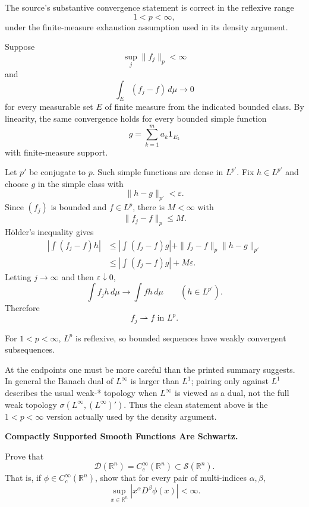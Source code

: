 \begin{solution}
The source's substantive convergence statement is correct in the reflexive range
\[
1<p<\infty,
\]
under the finite-measure exhaustion assumption used in its density argument.

Suppose
\[
\sup_j\|f_j\|_p<\infty
\]
and
\[
\int_E(f_j-f)\,d\mu\longrightarrow0
\]
for every measurable set \(E\) of finite measure from the indicated bounded class. By
linearity, the same convergence holds for every bounded simple function
\[
g=\sum_{k=1}^m a_k\mathbf1_{E_k}
\]
with finite-measure support.

Let \(p'\) be conjugate to \(p\). Such simple functions are dense in \(L^{p'}\). Fix
\(h\in L^{p'}\) and choose \(g\) in the simple class with
\[
\|h-g\|_{p'}<\varepsilon.
\]
Since \((f_j)\) is bounded and \(f\in L^p\), there is \(M<\infty\) with
\[
\|f_j-f\|_p\le M.
\]
Hölder's inequality gives
\[
\begin{aligned}
\left|
\int(f_j-f)h
\right|
&\le
\left|
\int(f_j-f)g
\right|
+
\|f_j-f\|_p\|h-g\|_{p'}\\
&\le
\left|
\int(f_j-f)g
\right|
+
M\varepsilon.
\end{aligned}
\]
Letting \(j\to\infty\) and then \(\varepsilon\downarrow0\),
\[
\int f_jh\,d\mu
\longrightarrow
\int fh\,d\mu
\qquad(h\in L^{p'}).
\]
Therefore
\[
\boxed{f_j\rightharpoonup f\text{ in }L^p.}
\]

For \(1<p<\infty\), \(L^p\) is reflexive, so bounded sequences have weakly convergent
subsequences.

At the endpoints one must be more careful than the printed summary suggests. In general the
Banach dual of \(L^\infty\) is larger than \(L^1\); pairing only against \(L^1\) describes
the usual weak-* topology when \(L^\infty\) is viewed as a dual, not the full weak topology
\(\sigma(L^\infty,(L^\infty)')\). Thus the clean statement above is the \(1<p<\infty\)
version actually used by the density argument.
\end{solution}


\begin{problem}[CP-II-0426]
\label{prob:cp-ii-0426}
\textbf{Compactly Supported Smooth Functions Are Schwartz.}

\hspace*{1.5em}Prove that
\[
\mathcal D(\mathbb R^n)=C_c^\infty(\mathbb R^n)
\subset
\mathcal S(\mathbb R^n).
\]
That is, if \(\phi\in C_c^\infty(\mathbb R^n)\), show that for every pair of
multi-indices \(\alpha,\beta\),
\[
\sup_{x\in\mathbb R^n}|x^\alpha D^\beta\phi(x)|<\infty.
\]
\end{problem}

